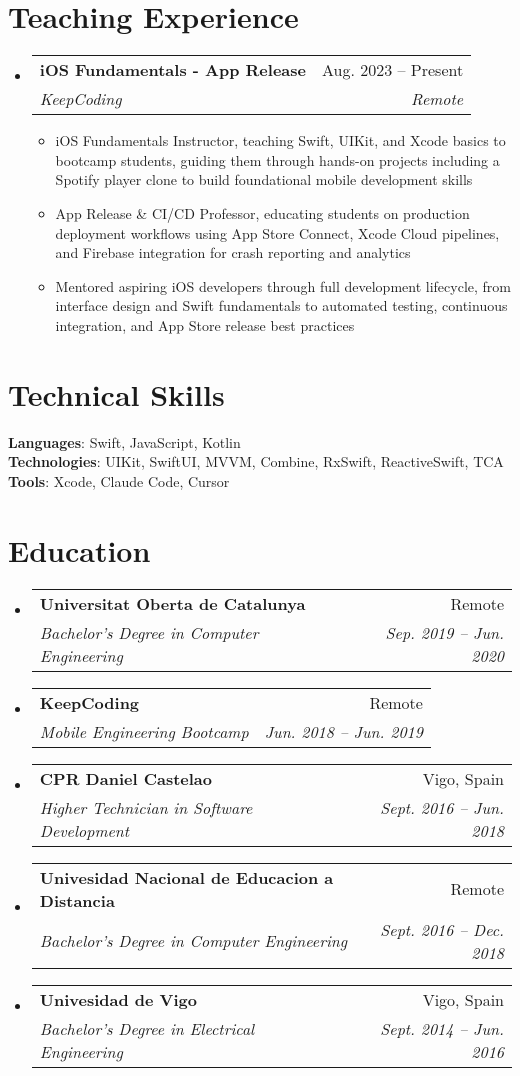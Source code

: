 \documentclass[letterpaper,11pt]{article}
\makeatletter
\newcommand{\resumeItem}[1]{
  \item\small{
    {#1 \vspace{-2pt}}
  }
}
\newcommand{\resumeSubheading}[4]{
  \vspace{-2pt}\item
    \begin{tabular*}{0.97\textwidth}[t]{l@{\extracolsep{\fill}}r}
      \textbf{#1} & #2 \\
      \textit{\small#3} & \textit{\small #4} \\
    \end{tabular*}\vspace{-7pt}
}
\newcommand{\resumeSubHeadingListStart}{\begin{itemize}[leftmargin=0.15in, label={}]}
\newcommand{\resumeSubHeadingListEnd}{\end{itemize}}
\newcommand{\resumeItemListStart}{\begin{itemize}}
\newcommand{\resumeItemListEnd}{\end{itemize}\vspace{-5pt}}
\makeatother
\begin{document}
\section{Teaching Experience}
    \resumeSubHeadingListStart
      \resumeSubheading
        {iOS Fundamentals - App Release}{Aug. 2023 -- Present}	
        {KeepCoding}{Remote}
        \resumeItemListStart
          \resumeItem{iOS Fundamentals Instructor, teaching Swift, UIKit, and Xcode basics to bootcamp students, guiding them through hands-on projects including a Spotify player clone to build foundational mobile development skills}
          \resumeItem{App Release \& CI/CD Professor, educating students on production deployment workflows using App Store Connect, Xcode Cloud pipelines, and Firebase integration for crash reporting and analytics}
          \resumeItem{Mentored aspiring iOS developers through full development lifecycle, from interface design and Swift fundamentals to automated testing, continuous integration, and App Store release best practices}
        \resumeItemListEnd
    \resumeSubHeadingListEnd


\section{Technical Skills}
 \begin{itemize}[leftmargin=0.15in, label={}]
    \small{\item{
     \textbf{Languages}{: Swift, JavaScript, Kotlin} \\
     \textbf{Technologies}{: UIKit, SwiftUI, MVVM, Combine, RxSwift, ReactiveSwift, TCA} \\
     \textbf{Tools}{: Xcode, Claude Code, Cursor} \\
    }}
 \end{itemize}
 
\section{Education}
  \resumeSubHeadingListStart
    \resumeSubheading
      {Universitat Oberta de Catalunya}{Remote}
      {Bachelor's Degree in Computer Engineering}{Sep. 2019 -- Jun. 2020}
    \resumeSubheading
      {KeepCoding}{Remote}
      {Mobile Engineering Bootcamp}{Jun. 2018 -- Jun. 2019}
    \resumeSubheading
      {CPR Daniel Castelao}{Vigo, Spain}
      {Higher Technician in Software Development}{Sept. 2016 -- Jun. 2018}
    \resumeSubheading
      {Univesidad Nacional de Educacion a Distancia}{Remote}
      {Bachelor's Degree in Computer Engineering}{Sept. 2016 -- Dec. 2018}
    \resumeSubheading
      {Univesidad de Vigo}{Vigo, Spain}
      {Bachelor's Degree in Electrical Engineering}{Sept. 2014 -- Jun. 2016}
  \resumeSubHeadingListEnd

\end{document}
